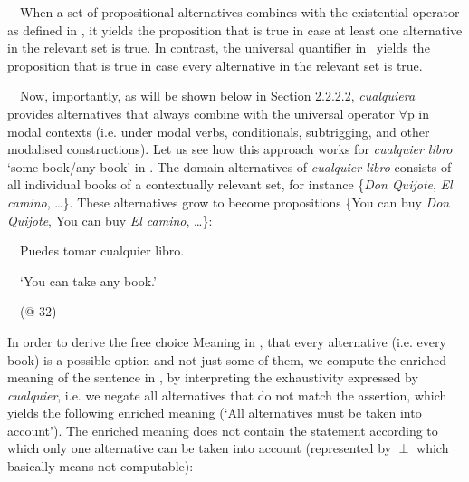 \begin{styleStandard}
\ \ When a set of propositional alternatives combines with the existential operator as defined in , it yields the proposition that is true in case at least one alternative in the relevant set is true. In contrast, the universal quantifier in \ yields the proposition that is true in case every alternative in the relevant set is true. 
\end{styleStandard}

\begin{styleStandard}
\ \ Now, importantly, as will be shown below in Section 2.2.2.2, \textit{cualquiera} provides alternatives that always combine with the universal operator ${\forall}$p in modal contexts (i.e. under modal verbs, conditionals, subtrigging, and other modalised constructions). Let us see how this approach works for \textit{cualquier libro} ‘some book/any book’ in . The domain alternatives of \textit{cualquier libro }consists of all individual books of a contextually relevant set, for instance \{\textit{Don Quijote}, \textit{El camino}, …\}. These alternatives grow to become propositions \{You can buy \textit{Don Quijote}, You can buy \textit{El camino}, …\}:
\end{styleStandard}

\begin{styleStandard}
\label{bkm:Ref533761676}\ \ Puedes tomar cualquier libro. 
\end{styleStandard}

\begin{styleStandard}
\ \ ‘You can take any book.’
\end{styleStandard}

\begin{styleStandard}
\ \ (@ 32)
\end{styleStandard}

\begin{styleStandard}
In order to derive the free choice Meaning in , that every alternative (i.e. every book) is a possible option and not just some of them, we compute the enriched meaning of the sentence in , by interpreting the exhaustivity expressed by \textit{cualquier}, i.e. we negate all alternatives that do not match the assertion, which yields the following enriched meaning (‘All alternatives must be taken into account’). The enriched meaning does not contain the statement according to which only one alternative can be taken into account (represented by ${\perp}$ which basically means not-computable):
\end{styleStandard}

